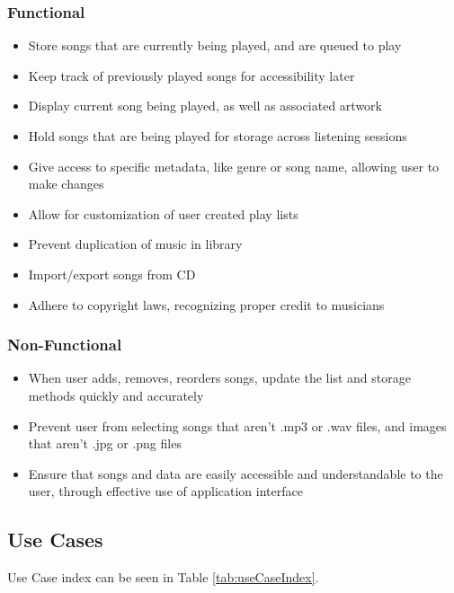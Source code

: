 \documentclass[10pt,conference,onecolumn,compsoc]{IEEEtran}
\begin{document}
\subsubsection{Functional}
\begin{itemize}
\item Store songs that are currently being played, and are queued to play
\item Keep track of previously played songs for accessibility later
\item Display current song being played, as well as associated artwork
\item Hold songs that are being played for storage across listening sessions
\item Give access to specific metadata, like genre or song name, allowing user to make changes
\item Allow for customization of user created play lists
\item Prevent duplication of music in library
\item Import/export songs from CD
\item Adhere to copyright laws, recognizing proper credit to musicians 
\end{itemize}

\subsubsection{Non-Functional}
\begin{itemize}
\item When user adds, removes, reorders songs, update the list and storage methods quickly and accurately
\item Prevent user from selecting songs that aren't .mp3 or .wav files, and images that aren't .jpg or .png files
\item Ensure that songs and data are easily accessible and understandable to the user, through effective use of application interface
\end{itemize}

\subsection{Use Cases}
Use Case index can be seen in Table \ref{tab:useCaseIndex}.
\end{document}
